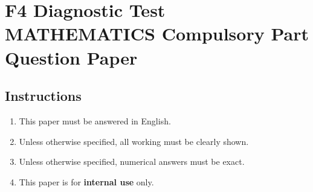 \documentclass[11pt]{article}
\begin{document}
    \thispagestyle{plain}

    \centering 

    \section*{F4 Diagnostic Test\\MATHEMATICS Compulsory Part\\Question Paper}

    \raggedright

    \subsection*{Instructions}

    \begin{enumerate}
        \item This paper must be answered in English.
        \item Unless otherwise specified, all working must be clearly shown.
        \item Unless otherwise specified, numerical answers must be exact.
        \item This paper is for \textbf{internal use} only.
    \end{enumerate}

    \newpage
\end{document}
